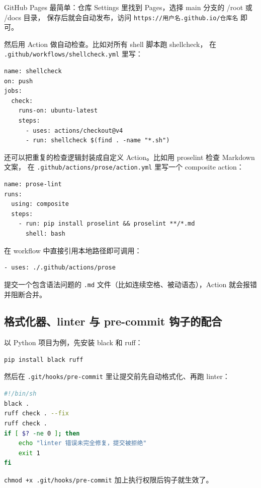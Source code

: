 \documentclass[a4paper,11pt]{ctexart}
\begin{document}
GitHub Pages 最简单：仓库 Settings 里找到 Pages，选择 main 分支的 /root 或 /docs 目录，
保存后就会自动发布，访问 \texttt{https://用户名.github.io/仓库名} 即可。

然后用 Action 做自动检查。比如对所有 shell 脚本跑 shellcheck，
在 \texttt{.github/workflows/shellcheck.yml} 里写：

\begin{lstlisting}[numbers=none]
name: shellcheck
on: push
jobs:
  check:
    runs-on: ubuntu-latest
    steps:
      - uses: actions/checkout@v4
      - run: shellcheck $(find . -name "*.sh")
\end{lstlisting}

还可以把重复的检查逻辑封装成自定义 Action。比如用 proselint 检查 Markdown 文案，
在 \texttt{.github/actions/prose/action.yml} 里写一个 composite action：

\begin{lstlisting}[numbers=none]
name: prose-lint
runs:
  using: composite
  steps:
    - run: pip install proselint && proselint **/*.md
      shell: bash
\end{lstlisting}

在 workflow 中直接引用本地路径即可调用：

\begin{lstlisting}[numbers=none]
- uses: ./.github/actions/prose
\end{lstlisting}

提交一个包含语法问题的 \texttt{.md} 文件（比如连续空格、被动语态），Action 就会报错并阻断合并。

\subsection{格式化器、linter 与 pre-commit 钩子的配合}

以 Python 项目为例，先安装 black 和 ruff：

\begin{lstlisting}[language=bash,numbers=none]
pip install black ruff
\end{lstlisting}

然后在 \texttt{.git/hooks/pre-commit} 里让提交前先自动格式化、再跑 linter：

\begin{lstlisting}[language=bash,numbers=none]
#!/bin/sh
black .
ruff check . --fix
ruff check .
if [ $? -ne 0 ]; then
    echo "linter 错误未完全修复，提交被拒绝"
    exit 1
fi
\end{lstlisting}

\texttt{chmod +x .git/hooks/pre-commit} 加上执行权限后钩子就生效了。
\end{document}
